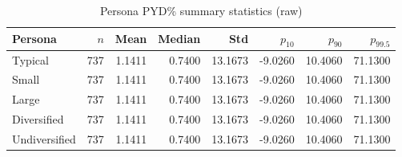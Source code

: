 \begin{table}[htbp]
\centering
\caption{Persona PYD\% summary statistics (raw)}
\label{tab:persona_pyd_raw}
\begin{tabular}{lrrrrrrr}
\toprule
\textbf{Persona} & $n$ & \textbf{Mean} & \textbf{Median} & \textbf{Std} & $p_{10}$ & $p_{90}$ & $p_{99.5}$ \\
\midrule
Typical & 737 & 1.1411 & 0.7400 & 13.1673 & -9.0260 & 10.4060 & 71.1300 \\
Small & 737 & 1.1411 & 0.7400 & 13.1673 & -9.0260 & 10.4060 & 71.1300 \\
Large & 737 & 1.1411 & 0.7400 & 13.1673 & -9.0260 & 10.4060 & 71.1300 \\
Diversified & 737 & 1.1411 & 0.7400 & 13.1673 & -9.0260 & 10.4060 & 71.1300 \\
Undiversified & 737 & 1.1411 & 0.7400 & 13.1673 & -9.0260 & 10.4060 & 71.1300 \\
\bottomrule
\end{tabular}
\end{table}
